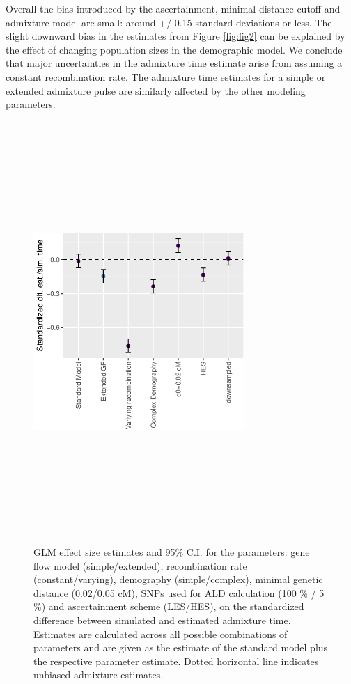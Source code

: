 \documentclass[11pt]{article}
\begin{document}
Overall the bias introduced by the ascertainment, minimal distance
cutoff and admixture model are small: around +/-0.15 standard deviations or less. The slight downward bias in the estimates from Figure \ref{fig:fig2} can be explained by the effect of changing population sizes in the demographic model. We conclude that major uncertainties in the admixture time
estimate arise from assuming a constant recombination rate. The
admixture time estimates for a simple or extended admixture pulse are similarly affected by the other modeling parameters.

\begin{figure}
\centering
\includegraphics[width=8cm,height=16cm,keepaspectratio]{ATE_Revisions_files/figure-latex/figResult_3-1.pdf}
\caption{\label{fig:fig3} GLM effect size estimates and 95\% C.I. for the parameters: gene flow model (simple/extended), recombination rate (constant/varying), demography (simple/complex), minimal genetic distance (0.02/0.05 cM), SNPs used for ALD calculation (100 \% / 5 \%) and ascertainment scheme (LES/HES), on the standardized difference between simulated and estimated admixture time. Estimates are calculated across all possible combinations of parameters and are given as the estimate of the standard model plus the respective parameter estimate. Dotted horizontal line indicates unbiased admixture estimates.}
\end{figure}
\end{document}
